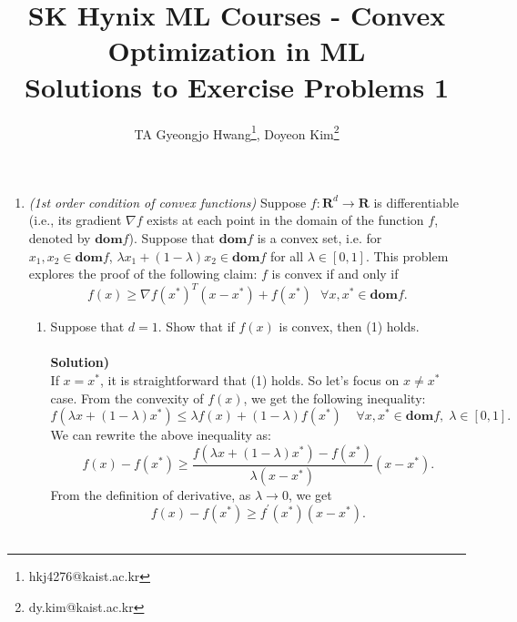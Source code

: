 \documentclass{article}
\title{SK Hynix ML Courses - Convex Optimization in ML\\ \vspace{0.2in} Solutions to Exercise Problems 1}
\author{TA Gyeongjo Hwang\footnote{hkj4276@kaist.ac.kr}, Doyeon Kim\footnote{dy.kim@kaist.ac.kr}}
\begin{document}
\maketitle

\begin{enumerate}
\item \textit{(1st order condition of convex functions)} Suppose $f: \mathbf{R}^d\rightarrow \mathbf{R}$ is differentiable (i.e., its gradient $\nabla f$ exists at each point in the domain of the function $f$, denoted by $\textbf{dom}f$). Suppose that $\textbf{dom}f$ is a convex set, i.e. for $x_1, x_2 \in \textbf{dom}f$, $\lambda x_1 + (1 - \lambda)x_2 \in \textbf{dom}f$ for all $\lambda \in [0,1]$. This problem explores the proof of the following claim: $f$ is convex if and only if
\begin{equation}
f(x) \geq \nabla f(x^*)^T(x-x^*)+f(x^*)~~~ \forall x,x^*\in \textbf{dom}f. \label{1st-ord-convexity}
\end{equation}

\begin{enumerate}
\item Suppose that $d=1$. Show that if $f(x)$ is convex, then (1) holds.\\\\
\textbf{Solution)}\\
If $x=x^*$, it is straightforward that (1) holds. So let's focus on $x \neq x^*$ case. From the convexity of $f(x)$, we get the following inequality:
\begin{equation*}
	f(\lambda x+(1-\lambda)x^*)\leq \lambda f(x)+(1-\lambda)f(x^*)\;\;\;\; \forall x,x^*\in \textbf{dom}f,\; \lambda \in [0,1].
\end{equation*}
We can rewrite the above inequality as:
\begin{equation*}
	f(x)-f(x^*)\geq \frac{f(\lambda x+(1-\lambda)x^*)-f(x^*)}{\lambda (x-x^*)}(x-x^*).
\end{equation*}
From the definition of derivative, as $\lambda \rightarrow 0$, we get
\begin{equation*}
	f(x)-f(x^*)\geq f^\prime (x^*)(x-x^*).
\end{equation*}
\\


\end{enumerate}
\end{enumerate}
\end{document}
